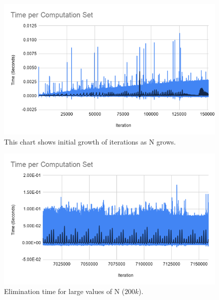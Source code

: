 \documentclass[journal]{IEEEtran}
\begin{document}
\begin{figure}[h!]
	\includegraphics[scale = 0.5]{TC2.png}
	\caption{This chart shows initial growth of iterations as N grows.}
\end{figure}

\begin{figure}[h!]
	\includegraphics[scale = 0.5]{TC3.png}
	\caption{Elimination time for large values of N ($200k$).}
\end{figure}
\end{document}
